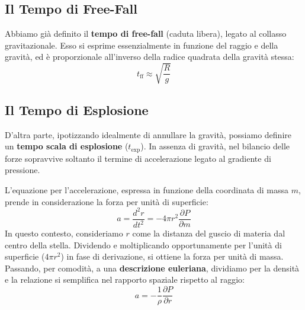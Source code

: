 \subsection{Il Tempo di Free-Fall}
Abbiamo già definito il \textbf{tempo di free-fall} (caduta libera), legato al collasso gravitazionale. Esso si esprime essenzialmente in funzione del raggio e della gravità, ed è proporzionale all'inverso della radice quadrata della gravità stessa:
\begin{equation}
t_{\text{ff}} \approx \sqrt{\frac{R}{g}}
\end{equation}

\subsection{Il Tempo di Esplosione}
D'altra parte, ipotizzando idealmente di annullare la gravità, possiamo definire un \textbf{tempo scala di esplosione} ($t_{\text{exp}}$). In assenza di gravità, nel bilancio delle forze sopravvive soltanto il termine di accelerazione legato al gradiente di pressione.

L'equazione per l'accelerazione, espressa in funzione della coordinata di massa $m$, prende in considerazione la forza per unità di superficie:
\begin{equation}
a = \frac{d^2 r}{dt^2} = - 4\pi r^2 \frac{\partial P}{\partial m}
\end{equation}
In questo contesto, consideriamo $r$ come la distanza del guscio di materia dal centro della stella. Dividendo e moltiplicando opportunamente per l'unità di superficie ($4\pi r^2$) in fase di derivazione, si ottiene la forza per unità di massa.
Passando, per comodità, a una \textbf{descrizione euleriana}, dividiamo per la densità e la relazione si semplifica nel rapporto spaziale rispetto al raggio:
\begin{equation}
a = - \frac{1}{\rho} \frac{\partial P}{\partial r}
\end{equation}

